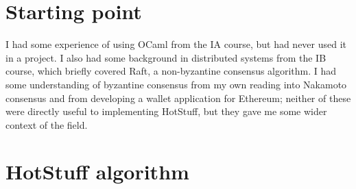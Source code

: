 




\section{Starting point}
I had some experience of using OCaml from the IA course, but had never used it in a project. I also had some background in distributed systems from the IB course, which briefly covered Raft, a non-byzantine consensus algorithm. I had some understanding of byzantine consensus from my own reading into Nakamoto consensus and from developing a wallet application for Ethereum; neither of these were directly useful to implementing HotStuff, but they gave me some wider context of the field.

\section{HotStuff algorithm}
